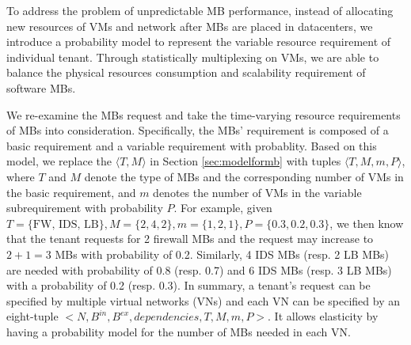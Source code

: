 \documentclass[10pt, conference, letterpaper]{IEEEtran}
\begin{document}
 









\appendix
To address the problem of unpredictable MB performance, instead of allocating new resources of VMs and network after MBs are placed in datacenters, we introduce a probability model to represent the variable resource requirement of individual tenant. Through statistically multiplexing on VMs, we are able to balance the physical resources consumption and scalability requirement of software MBs. 

We re-examine the MBs request and take the time-varying resource requirements of MBs into consideration. Specifically, the MBs' requirement is composed of a basic requirement and a variable requirement with probablity. Based on this model, we replace the $\langle T, M \rangle$ in Section \ref{sec:modelformb} with tuples $\langle T, M, m, P\rangle$, where $T$ and $M$  denote the type of MBs and the corresponding number of VMs in the basic requirement, and $m$ denotes the number of VMs in the variable subrequirement with probability $P$. For example, given $T=\{\text{FW, IDS, LB}\}, M=\{ 2, 4, 2\}, m=\{1, 2, 1\}, P=\{0.3, 0.2, 0.3\}$, we then know that the tenant requests for 2 firewall MBs and the request may increase to $2+1=3$ MBs with probability of 0.2. Similarly, 4 IDS MBs (resp. 2 LB MBs) are needed with probability of 0.8 (resp. 0.7) and 6 IDS MBs (resp. 3 LB MBs) with a probability of 0.2 (resp. 0.3). In summary, a tenant's request can be specified by multiple virtual networks (VNs) and each VN can be specified by an eight-tuple $<N, B^{in}, B^{ex}, dependencies, T, M, m, P>$. It allows elasticity by having a probability model for the number of MBs needed in each VN. 
\end{document}
